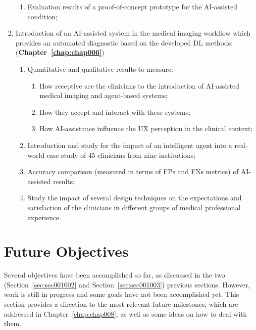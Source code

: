 \begin{enumerate}
\begin{enumerate}[label*=\arabic*.]
\item Evaluation results of a proof-of-concept prototype for the \ac{AI}-assisted condition;
\end{enumerate}
\item Introduction of an \ac{AI}-assisted system in the medical imaging workflow which provides an automated diagnostic based on the developed \ac{DL} methods; ({\bf Chapter~\ref{chap:chap006}})
\begin{enumerate}[label*=\arabic*.]
\item Quantitative and qualitative results to measure:
\begin{enumerate}[label*=\arabic*.]
\item How receptive are the clinicians to the introduction of \ac{AI}-assisted medical imaging and agent-based systems;
\item How they accept and interact with these systems;
\item How \ac{AI}-assistance influence the \ac{UX} perception in the clinical context;
\end{enumerate}
\item Introduction and study for the impact of an intelligent agent into a real-world case study of 45 clinicians from nine institutions;
\item Accuracy comparison (measured in terms of \acp{FP} and \acp{FN} metrics) of \ac{AI}-assisted results;
\item Study the impact of several design techniques on the expectations and satisfaction of the clinicians in different groups of medical professional experience.
\end{enumerate}
\end{enumerate}

\clearpage

\section{Future Objectives}
\label{sec:sec001004}

Several objectives have been accomplished so far, as discussed in the two (Section~\ref{sec:sec001002} and Section~\ref{sec:sec001003}) previous sections.
However, work is still in progress and some goals have not been accomplished yet.
This section provides a direction to the most relevant future milestones, which are addressed in Chapter~\ref{chap:chap008}, as well as some ideas on how to deal with them.

